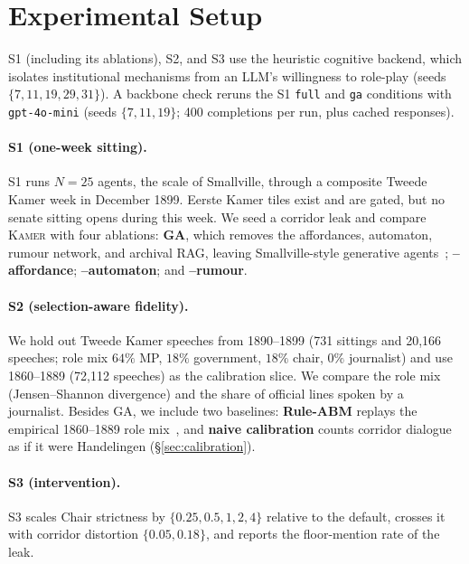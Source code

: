\documentclass[sigconf,review,anonymous]{acmart}
\newcommand{\sys}{\textsc{Kamer}}
\begin{document}
\section{Experimental Setup}
\label{sec:experiments}

S1 (including its ablations), S2, and S3 use the heuristic cognitive
backend, which isolates institutional mechanisms from an LLM's willingness
to role-play (seeds $\{7,11,19,29,31\}$). A backbone check reruns the S1
\texttt{full} and \texttt{ga} conditions with \texttt{gpt-4o-mini} (seeds
$\{7,11,19\}$; 400 completions per run, plus cached responses).

\paragraph{S1 (one-week sitting).} S1 runs $N{=}25$ agents, the scale of
Smallville, through a composite Tweede Kamer week in December 1899. Eerste
Kamer tiles exist and are gated, but no senate sitting opens during this
week. We seed a corridor leak and compare \sys{} with four ablations:
\textbf{GA}, which removes the affordances, automaton, rumour network, and
archival RAG, leaving Smallville-style generative
agents~\cite{park2023generative}; \textbf{--affordance};
\textbf{--automaton}; and \textbf{--rumour}.

\paragraph{S2 (selection-aware fidelity).} We hold out Tweede Kamer
speeches from 1890--1899 (731 sittings and 20{,}166 speeches; role mix
$64\%$ MP, $18\%$ government, $18\%$ chair, $0\%$ journalist) and use
1860--1889 (72{,}112 speeches) as the calibration slice. We compare the
role mix (Jensen--Shannon divergence) and the share of official lines
spoken by a journalist. Besides GA, we include two baselines:
\textbf{Rule-ABM} replays the empirical 1860--1889 role
mix~\cite{epstein1996growing}, and \textbf{naive calibration} counts
corridor dialogue as if it were Handelingen (\S\ref{sec:calibration}).

\paragraph{S3 (intervention).} S3 scales Chair strictness by
$\{0.25,0.5,1,2,4\}$ relative to the default, crosses it with corridor
distortion $\{0.05,0.18\}$, and reports the floor-mention rate of the leak.
\end{document}
